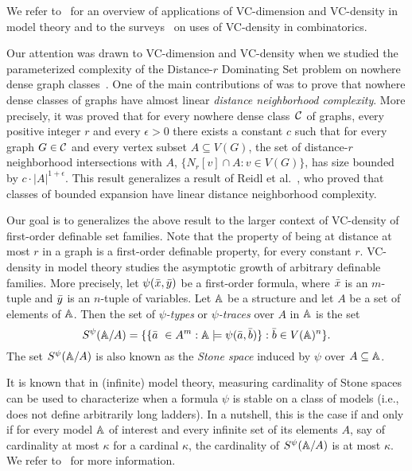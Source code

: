 We refer to~\cite{aschenbrenner2016vapnik} for an overview of 
applications of VC-dimension and VC-density in model
theory and to the surveys~\cite{furedi1991traces,matouvsek1998geometric} 
on uses of VC-density in
combinatorics. 

Our attention was drawn to VC-dimension and 
VC-density when we studied the parameterized 
complexity of the {\sc Distance-$r$ Dominating Set} 
problem on nowhere dense graph classes~\cite{eickmeyer2016neighborhood}. 
One of the main contributions of \cite{eickmeyer2016neighborhood}
was to prove that nowhere dense classes of graphs have almost linear
\emph{distance neighborhood complexity}. More precisely, it
was proved that for every nowhere dense class~$\mathcal{C}$ of 
graphs, every positive integer $r$ and every $\epsilon>0$ there
exists a constant $c$ such that for every graph $G\in\mathcal{C}$ and
every vertex subset $A\subseteq V(G)$, the set of distance-$r$ neighborhood intersections with $A$,
$\{N_r[v]\cap A \colon v\in V(G)\}$,
has size bounded by $c\cdot |A|^{1+\epsilon}$. This result
generalizes a result of Reidl et al.~\cite{reidl2016characterising}, who proved that classes of bounded expansion have linear distance neighborhood complexity. 

Our goal is to generalizes the above result to the larger context of VC-density of first-order definable set families.
Note that the property of being at distance at most $r$ in a graph is 
a first-order definable property, for every constant $r$.
VC-density in model theory studies the asymptotic growth 
of arbitrary definable families. More precisely, 
let $\psi(\bar{x},\bar{y})$ be a first-order formula, where 
$\bar{x}$ is an $m$-tuple and $\bar{y}$ is an $n$-tuple of variables. 
Let $\mathbb{A}$ be a structure and let $A$ be a set of elements of
$\mathbb{A}$. Then the set of \emph{$\psi$-types} or 
\emph{$\psi$-traces} over $A$ in 
$\mathbb{A}$ is the set
\[S^\psi(\mathbb{A}/A)=\{\{\bar{a}\ \in A^m : \mathbb{A}\models\psi(\bar{a},\bar{b})\} : \bar{b}\in V(\mathbb{A})^n\}.\]
The set $S^\psi(\mathbb{A}/A)$ is also known as the {\em{Stone space}} induced by $\psi$ over $A\subseteq \mathbb{A}$.

It is known that in (infinite) model theory,
measuring cardinality of Stone spaces can be used to characterize when a formula $\psi$ is stable on a class of models (i.e., does not define arbitrarily long ladders).
In a nutshell, this is the case if and only if for every model $\mathbb{A}$ of interest and every infinite set of its elements $A$, say of cardinality at most $\kappa$ for a cardinal $\kappa$,
the cardinality of $S^\psi(\mathbb{A}/A)$ is at most $\kappa$. We refer to~\cite{pillay} for more information.

